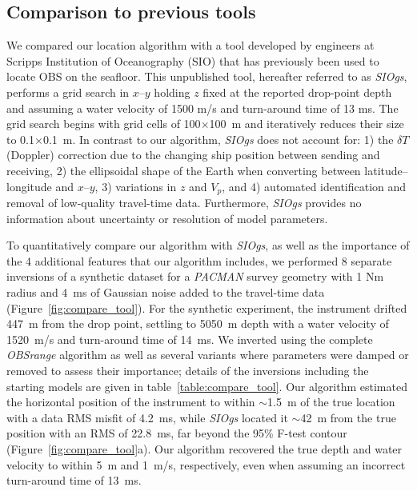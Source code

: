 \subsection{Comparison to previous tools}

We compared our location algorithm with a tool developed by engineers at Scripps Institution of Oceanography (SIO) that has previously been used to locate OBS on the seafloor. This unpublished tool, hereafter referred to as \textit{SIOgs}, performs a grid search in $x$--$y$ holding $z$ fixed at the reported drop-point depth and assuming a water velocity of 1500 m/s and turn-around time of 13 ms. The grid search begins with grid cells of 100$\times$100~m and iteratively reduces their size to 0.1$\times$0.1~m. In contrast to our algorithm, \textit{SIOgs} does not account for: 1) the $\delta T$ (Doppler) correction due to the changing ship position between sending and receiving, 2) the ellipsoidal shape of the Earth when converting between latitude--longitude and $x$--$y$, 3) variations in $z$ and $V_p$, and 4) automated identification and removal of low-quality travel-time data. Furthermore, \textit{SIOgs} provides no information about uncertainty or resolution of model parameters.  

To quantitatively compare our algorithm with \textit{SIOgs}, as well as the importance of the 4 additional features that our algorithm includes, we performed 8 separate inversions of a synthetic dataset for a \textit{PACMAN} survey geometry with 1 Nm radius and 4~ms of Gaussian noise added to the travel-time data (Figure~\ref{fig:compare_tool}). For the synthetic experiment, the instrument drifted 447~m from the drop point, settling to 5050~m depth with a water velocity of 1520~m/s and turn-around time of 14~ms. We inverted using the complete \textit{OBSrange} algorithm as well as several variants where parameters were damped or removed to assess their importance; details of the inversions including the starting models are given in table~\ref{table:compare_tool}. Our algorithm estimated the horizontal position of the instrument to within $\sim$1.5~m of the true location with a data RMS misfit of 4.2~ms, while \textit{SIOgs} located it $\sim$42~m from the true position with an RMS of 22.8~ms, far beyond the 95\% F-test contour (Figure~\ref{fig:compare_tool}a). Our algorithm recovered the true depth and water velocity to within 5~m and 1~m/s, respectively, even when assuming an incorrect turn-around time of 13~ms.


